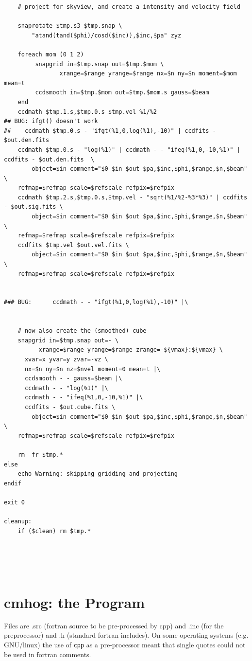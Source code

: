 \documentclass[10pt,dvips]{article}
\begin{document}
\begin{verbatim}
    # project for skyview, and create a intensity and velocity field

    snaprotate $tmp.s3 $tmp.snap \
        "atand(tand($phi)/cosd($inc)),$inc,$pa" zyz

    foreach mom (0 1 2)
         snapgrid in=$tmp.snap out=$tmp.$mom \
                xrange=$range yrange=$range nx=$n ny=$n moment=$mom mean=t
         ccdsmooth in=$tmp.$mom out=$tmp.$mom.s gauss=$beam
    end
    ccdmath $tmp.1.s,$tmp.0.s $tmp.vel %1/%2
## BUG: ifgt() doesn't work
##    ccdmath $tmp.0.s - "ifgt(%1,0,log(%1),-10)" | ccdfits - $out.den.fits
    ccdmath $tmp.0.s - "log(%1)" | ccdmath - - "ifeq(%1,0,-10,%1)" | ccdfits - $out.den.fits  \
        object=$in comment="$0 $in $out $pa,$inc,$phi,$range,$n,$beam"  \
	refmap=$refmap scale=$refscale refpix=$refpix
    ccdmath $tmp.2.s,$tmp.0.s,$tmp.vel - "sqrt(%1/%2-%3*%3)" | ccdfits - $out.sig.fits \
        object=$in comment="$0 $in $out $pa,$inc,$phi,$range,$n,$beam" 	\
	refmap=$refmap scale=$refscale refpix=$refpix
    ccdfits $tmp.vel $out.vel.fits \
        object=$in comment="$0 $in $out $pa,$inc,$phi,$range,$n,$beam" 	\
	refmap=$refmap scale=$refscale refpix=$refpix


### BUG:      ccdmath - - "ifgt(%1,0,log(%1),-10)" |\


    # now also create the (smoothed) cube
    snapgrid in=$tmp.snap out=- \
          xrange=$range yrange=$range zrange=-${vmax}:${vmax} \
	  xvar=x yvar=y zvar=-vz \
	  nx=$n ny=$n nz=$nvel moment=0 mean=t |\
      ccdsmooth - - gauss=$beam |\
      ccdmath - - "log(%1)" |\
      ccdmath - - "ifeq(%1,0,-10,%1)" |\
      ccdfits - $out.cube.fits \
        object=$in comment="$0 $in $out $pa,$inc,$phi,$range,$n,$beam" \
	refmap=$refmap scale=$refscale refpix=$refpix

    rm -fr $tmp.*
else
    echo Warning: skipping gridding and projecting
endif

exit 0

cleanup:
    if ($clean) rm $tmp.*





\end{verbatim}\normalsize



\section{cmhog: the Program}

Files are .src (fortran source to be pre-processed by cpp) and 
.inc (for the preprocessor) and .h (standard fortran includes).
On some operating systems (e.g. GNU/linux) the use of
{\tt cpp} as a pre-processor meant that single quotes could 
not be used in fortran comments.
\end{document}
